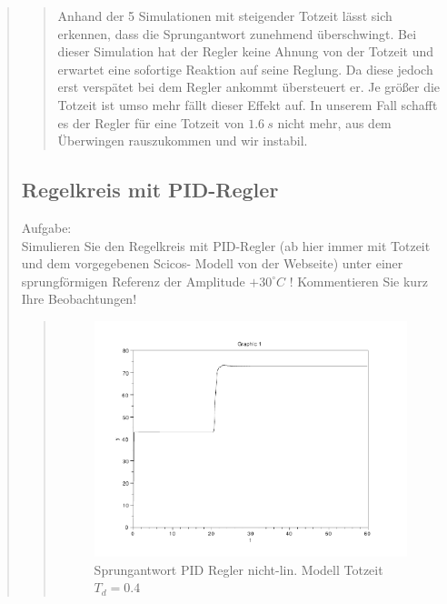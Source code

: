 \begin{quote}
\begin{quote}
        Anhand der 5 Simulationen mit steigender Totzeit lässt sich erkennen, dass die Sprungantwort zunehmend
        überschwingt. Bei dieser Simulation hat der Regler keine Ahnung von der Totzeit und erwartet eine sofortige
        Reaktion auf seine Reglung. Da diese jedoch erst verspätet bei dem Regler ankommt übersteuert er. Je größer die
        Totzeit ist umso mehr fällt dieser Effekt auf. In unserem Fall schafft es der Regler für eine Totzeit von $1.6
        \ s$ nicht mehr, aus dem Überwingen rauszukommen und wir instabil.\\
        \vspace{1em}
    
    \end{quote}
    
    \subsection{Regelkreis mit PID-Regler}
    Aufgabe:\\
    Simulieren Sie den Regelkreis mit PID-Regler (ab hier immer mit Totzeit und dem vorgegebenen Scicos- Modell von der
    Webseite) unter einer sprungförmigen Referenz der Amplitude $+30^{\circ}C$ ! Kommentieren Sie kurz Ihre
    Beobachtungen!\vspace{1em}
    
    \begin{quote}
        \begin{figure}[H]
        \centering
            \includegraphics[scale=0.7, trim = 0cm 0cm 0cm 0cm, clip]{./Bilder/4_2_Td_04}
                \caption{Sprungantwort PID Regler nicht-lin. Modell Totzeit $T_d = 0.4$}
        \end{figure}
        

\end{quote}
\end{quote}
